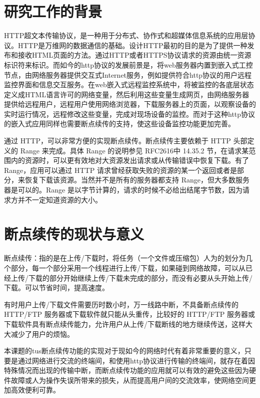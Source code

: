 \documentclass[bachelor]{thesis-uestc}
\begin{document}
\thesistableofcontents

\thesischapterexordium

\section{研究工作的背景}
HTTP超文本传输协议，是一种用于分布式、协作式和超媒体信息系统的应用层协议。HTTP是万维网的数据通信的基础。设计HTTP最初的目的是为了提供一种发布和接收HTML页面的方法。通过HTTP或者HTTPS协议请求的资源由统一资源标识符来标识。而如今的http协议的发展前景是，将web服务器内置到嵌入式工控节点，由网络服务器提供交互式Internet服务，例如提供符合http协议的用户远程监控界面和信息交互服务。在web嵌入式远程监控系统中，将被监控的各底层状态定义成HTML语言许可的网络变量，然后利用这些变量生成网页，由网络服务器提供给远程用户，远程用户使用网络浏览器，下载服务器上的页面，以观察设备的实时运行情况，远程修改这些变量，完成对现场设备的监控。而对于这种http协议的嵌入式应用同样也需要断点续传的支持，使这些设备监控功能更加完善。
\par 通过 HTTP，可以非常方便的实现断点续传。断点续传主要依赖于 HTTP 头部定义的 Range 来完成。具体 Range 的说明参见 RFC2616中 14.35.2 节，在请求某范围内的资源时，可以更有效地对大资源发出请求或从传输错误中恢复下载。有了 Range，应用可以通过 HTTP 请求曾经获取失败的资源的某一个返回或者是部分，来恢复下载该资源。当然并不是所有的服务器都支持 Range，但大多数服务器是可以的。Range 是以字节计算的，请求的时候不必给出结尾字节数，因为请求方并不一定知道资源的大小。


\section{断点续传的现状与意义}
断点续传：指的是在上传/下载时，将任务（一个文件或压缩包）人为的划分为几个部分，每一个部分采用一个线程进行上传/下载，如果碰到网络故障，可以从已经上传/下载的部分开始继续上传/下载未完成的部分，而没有必要从头开始上传/下载。可以节省时间，提高速度。
\par 有时用户上传/下载文件需要历时数小时，万一线路中断，不具备断点续传的 HTTP/FTP 服务器或下载软件就只能从头重传，比较好的 HTTP/FTP 服务器或下载软件具有断点续传能力，允许用户从上传/下载断线的地方继续传送，这样大大减少了用户的烦恼。
\par 本课题的tus断点续传功能的实现对于现如今的网络时代有着非常重要的意义，只要是通过网络进行交流的终端间，和使用http协议进行传输的终端间，就存在着因特殊情况而出现的传输中断，而断点续传功能的应用就可以有效的避免这些因为硬件故障或人为操作失误所带来的损失，从而提高用户间的交流效率，使网络空间更加高效便利可靠。
\end{document}
